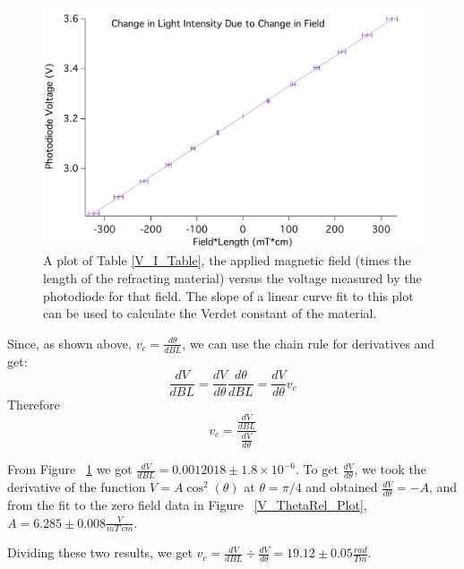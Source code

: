 \documentclass[prb,preprint]{revtex4-1}
\begin{document}
\begin{figure}[h!]
\centering
\includegraphics[width=5in]{V_B-L_Plot.pdf}
\caption{A plot of Table \ref{V_I_Table}, the applied magnetic field (times the length of the refracting material) versus the voltage measured by the photodiode for that field. The slope of a linear curve fit to this plot can be used to calculate the Verdet constant of the material. }
\label{V_B*L_Plot}
\end{figure}


Since, as shown above, $v_c = \frac{d \theta}{dBL}$, we can use the chain rule for derivatives and get: 
\begin{equation}
\frac{ dV}{ dBL} = \frac{dV}{d\theta} \frac{d\theta}{dBL} = \frac{dV}{d\theta} v_c
\end{equation}
Therefore 
\begin{equation} 
v_c = \frac{\frac{dV}{dBL}}{\frac{dV}{d\theta}}
\end{equation}

From Figure ~\ref{V_B*L_Plot} we got $\frac{dV}{dBL} = 0.0012018 \pm 1.8 \times 10^{-6}$. To get $\frac{dV}{d\theta}$, we took the derivative of the function $V = A \cos^{2}(\theta)$ at $\theta = \pi/4$ and obtained $\frac{dV}{d\theta} = -A$, and from the fit to the zero field data in Figure ~\ref{V_ThetaRel_Plot}, $A = 6.285 \pm 0.008 \frac{V}{mT\ cm}$.  

Dividing these two results, we get $v_c = \frac{dV}{dBL} \div \frac{dV}{d\theta} = 19.12 \pm 0.05 \frac{rad}{Tm}$.  

\end{document}
